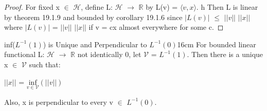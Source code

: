     \begin{proof}
        For fixed x $\in$ $\mathcal{H}$, define
        L: $\mathcal{H}$ $\rightarrow$ $\mathbb{R}$
        by L(v) = $\langle v , x \rangle$.
        h
        Then L is linear by {\color{red} theorem 19.1.9}
        and bounded by {\color{orange} corollary 19.1.6}
        since $|L(v)|$ $\leq$ $||v||$ $||x||$
        where $|L(v)|$ = $||v||$ $||x||$ if v = cx almost everywhere for some c.
    \end{proof}

    \newpage



    \begin{wtheorem}{inf($L^{-1}(1)$) is Unique
    and Perpendicular to $L^{-1}(0)$}{16cm}
        For bounded linear functional L: $\mathcal{H}$ $\rightarrow$ $\mathbb{R}$
        not identically 0, let $\mathcal{V}$ = $L^{-1}(1)$.
        Then there is a unique x $\in$ $\mathcal{V}$ such that:

        \hspace{0.5cm}
        $||x||$ = $\underset{v \in \mathcal{V}}{\text{inf}} (||v||)$

        Also, x is perpendicular to every v $\in$ $L^{-1}(0)$.
    \end{wtheorem}

